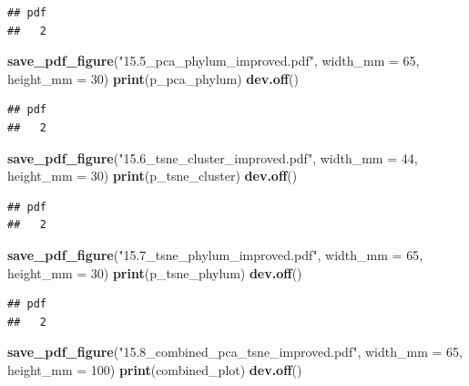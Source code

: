 \documentclass[
]{article}
\newenvironment{Shaded}{\begin{snugshade}}{\end{snugshade}}
\newcommand{\AttributeTok}[1]{\textcolor[rgb]{0.13,0.29,0.53}{#1}}
\newcommand{\DecValTok}[1]{\textcolor[rgb]{0.00,0.00,0.81}{#1}}
\newcommand{\FunctionTok}[1]{\textcolor[rgb]{0.13,0.29,0.53}{\textbf{#1}}}
\newcommand{\NormalTok}[1]{#1}
\newcommand{\StringTok}[1]{\textcolor[rgb]{0.31,0.60,0.02}{#1}}
\begin{document}
\begin{verbatim}
## pdf 
##   2
\end{verbatim}

\begin{Shaded}
\begin{Highlighting}[]
\FunctionTok{save\_pdf\_figure}\NormalTok{(}\StringTok{"15.5\_pca\_phylum\_improved.pdf"}\NormalTok{, }\AttributeTok{width\_mm =} \DecValTok{65}\NormalTok{, }\AttributeTok{height\_mm =} \DecValTok{30}\NormalTok{)}
\FunctionTok{print}\NormalTok{(p\_pca\_phylum)}
\FunctionTok{dev.off}\NormalTok{()}
\end{Highlighting}
\end{Shaded}

\begin{verbatim}
## pdf 
##   2
\end{verbatim}

\begin{Shaded}
\begin{Highlighting}[]
\FunctionTok{save\_pdf\_figure}\NormalTok{(}\StringTok{"15.6\_tsne\_cluster\_improved.pdf"}\NormalTok{, }\AttributeTok{width\_mm =} \DecValTok{44}\NormalTok{, }\AttributeTok{height\_mm =} \DecValTok{30}\NormalTok{)}
\FunctionTok{print}\NormalTok{(p\_tsne\_cluster)}
\FunctionTok{dev.off}\NormalTok{()}
\end{Highlighting}
\end{Shaded}

\begin{verbatim}
## pdf 
##   2
\end{verbatim}

\begin{Shaded}
\begin{Highlighting}[]
\FunctionTok{save\_pdf\_figure}\NormalTok{(}\StringTok{"15.7\_tsne\_phylum\_improved.pdf"}\NormalTok{, }\AttributeTok{width\_mm =} \DecValTok{65}\NormalTok{, }\AttributeTok{height\_mm =} \DecValTok{30}\NormalTok{)}
\FunctionTok{print}\NormalTok{(p\_tsne\_phylum)}
\FunctionTok{dev.off}\NormalTok{()}
\end{Highlighting}
\end{Shaded}

\begin{verbatim}
## pdf 
##   2
\end{verbatim}

\begin{Shaded}
\begin{Highlighting}[]
\FunctionTok{save\_pdf\_figure}\NormalTok{(}\StringTok{"15.8\_combined\_pca\_tsne\_improved.pdf"}\NormalTok{, }\AttributeTok{width\_mm =} \DecValTok{65}\NormalTok{, }\AttributeTok{height\_mm =} \DecValTok{100}\NormalTok{)}
\FunctionTok{print}\NormalTok{(combined\_plot)}
\FunctionTok{dev.off}\NormalTok{()}
\end{Highlighting}
\end{Shaded}
\end{document}
